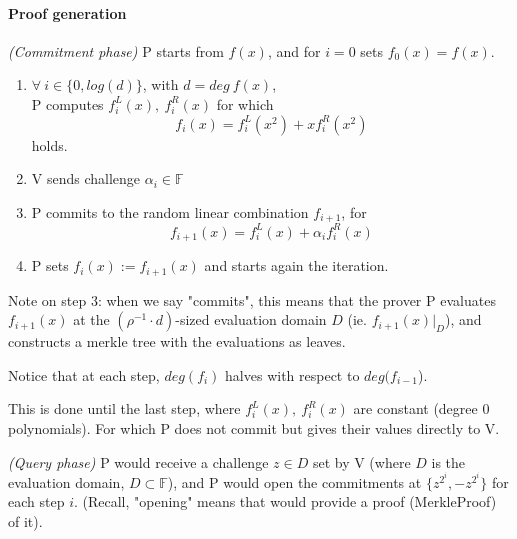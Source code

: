 \documentclass{article}
\theoremstyle{definition}
\begin{document}
\vspace{30px}

\paragraph{Proof generation}

\emph{(Commitment phase)}
P starts from $f(x)$, and for $i=0$ sets $f_0(x)=f(x)$.
\begin{enumerate}
	\item $\forall~i \in \{0, log(d)\}$, with $d = deg~f(x)$,\\
		P computes $f_i^L(x),~ f_i^R(x)$ for which
		\begin{equation}\tag{eq. $A_i$}
			f_i(x) = f_i^L(x^2) + x f_i^R(x^2)
		\end{equation}
		holds.
	\item V sends challenge $\alpha_i \in \mathbb{F}$
	\item P commits to the random linear combination $f_{i+1}$, for
		\begin{equation}\tag{eq. $B_i$}
		f_{i+1}(x) = f_i^L(x) + \alpha_i f_i^R(x)
	\end{equation}
	\item P sets $f_i(x) := f_{i+1}(x)$ and starts again the iteration.
\end{enumerate}

Note on step 3: when we say "commits", this means that the prover P evaluates $f_{i+1}(x)$ at the $(\rho^{-1} \cdot d)$-sized evaluation
domain $D$ (ie. $f_{i+1}(x) |_D$), and constructs a merkle tree with the
evaluations as leaves.

\vspace{0.5cm}
Notice that at each step, $deg(f_i)$ halves with respect to $deg(f_{i-1}$).

This is done until the last step, where $f_i^L(x),~ f_i^R(x)$ are constant (degree 0 polynomials). For which P does not commit but gives their values directly to V.

\emph{(Query phase)}
P would receive a challenge $z \in D$ set by V (where $D$ is the evaluation
domain, $D \subset \mathbb{F}$), and P would open the commitments at $\{z^{2^i}, -z^{2^i}\}$ for each step $i$.
(Recall, "opening" means that would provide a proof (MerkleProof) of it).
\end{document}
